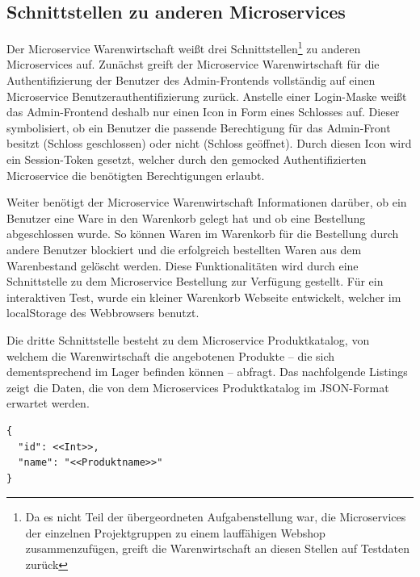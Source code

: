 \subsection{Schnittstellen zu anderen Microservices}
\label{subsec: Schnittstellen zu anderen Microservices}
Der Microservice Warenwirtschaft weißt drei Schnittstellen\footnote{Da es nicht Teil der übergeordneten Aufgabenstellung war, die Microservices der einzelnen Projektgruppen zu einem lauffähigen Webshop zusammenzufügen, greift die Warenwirtschaft an diesen Stellen auf Testdaten zurück} zu anderen Microservices auf. Zunächst greift der Microservice Warenwirtschaft für die Authentifizierung der Benutzer des Admin-Frontends vollständig auf einen Microservice Benutzerauthentifizierung zurück. Anstelle einer Login-Maske weißt das Admin-Frontend deshalb nur einen Icon in Form eines Schlosses auf. Dieser symbolisiert, ob ein Benutzer die passende Berechtigung für das Admin-Front besitzt (Schloss geschlossen) oder nicht (Schloss geöffnet).
Durch diesen Icon wird ein Session-Token gesetzt, welcher durch den gemocked Authentifizierten Microservice die benötigten Berechtigungen erlaubt.\par
Weiter benötigt der Microservice Warenwirtschaft Informationen darüber, ob ein Benutzer eine Ware in den Warenkorb gelegt hat und ob eine Bestellung abgeschlossen wurde. So können Waren im Warenkorb für die Bestellung durch andere Benutzer blockiert und die erfolgreich bestellten Waren aus dem Warenbestand gelöscht werden. Diese Funktionalitäten wird durch eine Schnittstelle zu dem Microservice Bestellung zur Verfügung gestellt. Für ein interaktiven Test, wurde ein kleiner Warenkorb Webseite entwickelt, welcher im localStorage des Webbrowsers benutzt.\par
Die dritte Schnittstelle besteht zu dem Microservice Produktkatalog, von welchem die Warenwirtschaft die angebotenen Produkte -- die sich dementsprechend im Lager befinden können -- abfragt. Das nachfolgende Listings zeigt die Daten, die von dem  Microservices Produktkatalog im JSON-Format erwartet werden.

\begin{lstlisting}[caption=Datenabfrage aus dem Produktkatalog]
{
  "id": <<Int>>,
  "name": "<<Produktname>>"
}
\end{lstlisting}


\newpage
